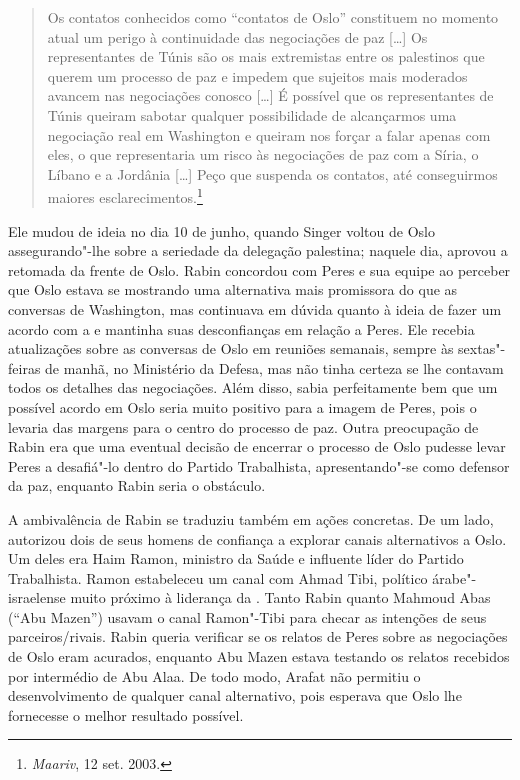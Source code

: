 \begin{quote}
Os contatos conhecidos como ``contatos de Oslo'' constituem no momento
atual um perigo à continuidade das negociações de paz {[}\ldots{}{]} Os
representantes de Túnis são os mais extremistas entre os palestinos que
querem um processo de paz e impedem que sujeitos mais moderados avancem
nas negociações conosco {[}\ldots{}{]} É possível que os representantes de Túnis
queiram sabotar qualquer possibilidade de alcançarmos uma negociação
real em Washington e queiram nos forçar a falar apenas com eles, o que
representaria um risco às negociações de paz com a Síria, o Líbano e a
Jordânia {[}\ldots{}{]} Peço que suspenda os contatos, até conseguirmos maiores
esclarecimentos.\footnote{\emph{Maariv}, 12 set. 2003.}
\end{quote}

Ele mudou de ideia no dia 10 de junho, quando Singer voltou de Oslo
assegurando"-lhe sobre a seriedade da delegação palestina; naquele dia,
aprovou a retomada da frente de Oslo. Rabin concordou com Peres e sua
equipe ao perceber que Oslo estava se mostrando uma alternativa mais
promissora do que as conversas de Washington, mas continuava em dúvida
quanto à ideia de fazer um acordo com a  e mantinha suas
desconfianças em relação a Peres. Ele recebia atualizações sobre as
conversas de Oslo em reuniões semanais, sempre às sextas"-feiras de
manhã, no Ministério da Defesa, mas não tinha certeza se lhe contavam
todos os detalhes das negociações. Além disso, sabia perfeitamente bem
que um possível acordo em Oslo seria muito positivo para a imagem de
Peres, pois o levaria das margens para o centro do processo de paz.
Outra preocupação de Rabin era que uma eventual decisão de encerrar o
processo de Oslo pudesse levar Peres a desafiá"-lo dentro do Partido
Trabalhista, apresentando"-se como defensor da paz, enquanto Rabin seria
o obstáculo.

A ambivalência de Rabin se traduziu também em ações concretas. De um
lado, autorizou dois de seus homens de confiança a explorar canais
alternativos a Oslo. Um deles era Haim Ramon, ministro da Saúde e
influente líder do Partido Trabalhista. Ramon estabeleceu um canal com
Ahmad Tibi, político árabe"-israelense muito próximo à liderança da .
Tanto Rabin quanto Mahmoud Abas (``Abu Mazen'') usavam o canal Ramon"-Tibi
para checar as intenções de seus parceiros/rivais. Rabin queria
verificar se os relatos de Peres sobre as negociações de Oslo eram
acurados, enquanto Abu Mazen estava testando os relatos recebidos por
intermédio de Abu Alaa. De todo modo, Arafat não permitiu o
desenvolvimento de qualquer canal alternativo, pois esperava que Oslo
lhe fornecesse o melhor resultado possível.

